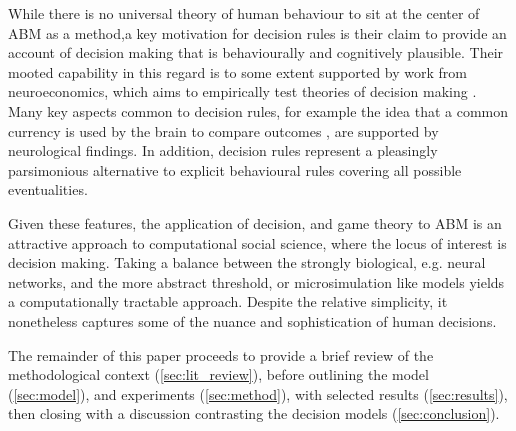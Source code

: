 While there is no universal theory of human behaviour to sit at the center of \ac{ABM} as a method,a key motivation for decision rules is their claim to provide an account of decision making that is behaviourally and cognitively plausible. Their mooted capability in this regard is to some extent supported by work from neuroeconomics, which aims to empirically test theories of decision making \citep{Rustichini2009}. Many key aspects common to decision rules, for example the idea that a common currency is used by the brain to compare outcomes \citep{Padoa-Schioppa2006,Padoa-Schioppa2008}, are supported by neurological findings. In addition, decision rules represent a pleasingly parsimonious alternative to explicit behavioural rules covering all possible eventualities. 

Given these features, the application of decision, and game theory to \ac{ABM} is an attractive approach to computational social science, where the locus of interest is decision making. Taking a balance between the strongly biological, e.g. neural networks, and the more abstract threshold, or microsimulation like models yields a computationally tractable approach. Despite the relative simplicity, it nonetheless captures some of the nuance and sophistication of human decisions.


The remainder of this paper proceeds to provide a brief review of the methodological context (\ref{sec:lit_review}), before outlining the model (\ref{sec:model}), and experiments (\ref{sec:method}), with selected results (\ref{sec:results}), then closing with a discussion contrasting the decision models (\ref{sec:conclusion}).